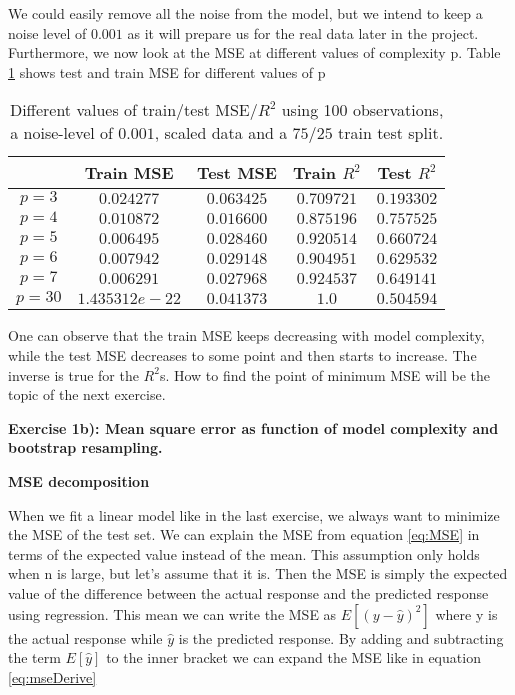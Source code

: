 \documentclass[12pt,a4paper]{article}
\begin{document}
\noindent We could easily remove all the noise from the model, but we intend to keep a noise level of $0.001$ as it will prepare us for the real data later in the project. Furthermore, we now look at the MSE at different values of complexity p. Table \ref{tab:asp} shows test and train MSE for different values of p

\begin{table}[H]
\caption{\label{tab:asp} Different values of train/test MSE/$R^2$ using 100 observations, a noise-level of $0.001$, scaled data and a $75/25$ train test split.}
\centering
\begin{tabular}{c|c|c|c|c}
 & Train MSE & Test MSE & Train $R^2$ & Test $R^2$\\
\hline
$p = 3$ & $0.024277$ & $0.063425$ & $0.709721$ & $0.193302$\\
\hline
$p = 4$ & $0.010872$ & $0.016600$ & $0.875196$ & $0.757525$\\
\hline
$p = 5$ & $0.006495$ & $0.028460$ & $0.920514$ & $0.660724$\\
\hline
$p = 6$ & $0.007942$ & $0.029148$ & $0.904951$ & $0.629532$\\
\hline
$p = 7$ & $0.006291$ & $0.027968$ & $0.924537$ & $0.649141$\\
\hline
$p = 30$ & $1.435312e-22$ & $0.041373$ & $1.0$ & $0.504594$\\
\end{tabular}
\end{table}

\noindent One can observe that the train MSE keeps decreasing with model complexity, while the test MSE decreases to some point and then starts to increase. The inverse is true for the $R^2$s. How to find the point of minimum MSE will be the topic of the next exercise.


\newpage

\begin{center}
\Large{\textbf{Exercise 1b): Mean square error as function of model complexity and bootstrap resampling.}}
\end{center}

\begin{center}
\large{\textbf{MSE decomposition}}
\end{center}

\noindent When we fit a linear model like in the last exercise, we always want to minimize the MSE of the test set. We can explain the MSE from equation \ref{eq:MSE} in terms of the expected value instead of the mean. This assumption only holds when n is large, but let's assume that it is. Then the MSE is simply the expected value of the difference between the actual response and the predicted response using regression. This mean we can write the MSE as $E[(y-\hat{y})^2]$ where y is the actual response while $\hat{y}$ is the predicted response. By adding and subtracting the term $E[\hat{y}]$ to the inner bracket we can expand the MSE like in equation \ref{eq:mseDerive}
\end{document}
